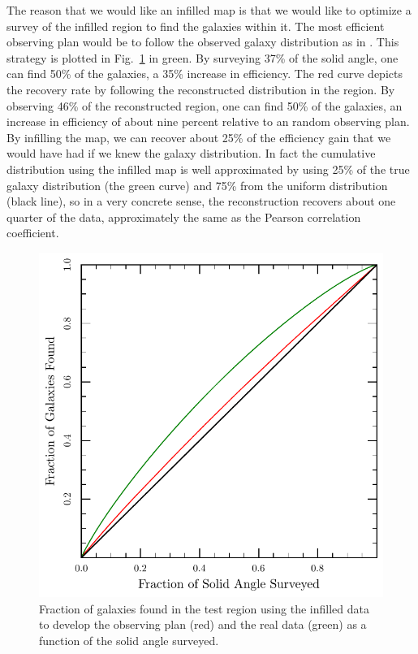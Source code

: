 \documentclass[useAMS,usenatbib]{mn2e}
\begin{document}
The reason that we would like an infilled map is that we would like to
optimize a survey of the infilled region to find the galaxies within
it.  The most efficient observing plan would be to follow the observed
galaxy distribution as in \citet{2016MNRAS.462.1085A}.  This strategy
is plotted in Fig.~\ref{fig:test_dist} in green.  By surveying 37\% of
the solid angle, one can find 50\% of the galaxies, a 35\% increase in
efficiency.  The red curve depicts the recovery rate by following the
reconstructed distribution in the region.  By observing 46\% of the
reconstructed region, one can find 50\% of the galaxies, an increase
in efficiency of about nine percent relative to an random observing
plan.  By infilling the map, we can recover about 25\% of the
efficiency gain that we would have had if we knew the galaxy
distribution. In fact the cumulative distribution using the infilled
map is well approximated by using 25\% of the true galaxy distribution
(the green curve) and 75\% from the uniform distribution (black line),
so in a very concrete sense, the reconstruction recovers about one
quarter of the data, approximately the same as the Pearson correlation
coefficient.
\begin{figure}
  \includegraphics[width=\columnwidth]{test_dist}
  \caption{Fraction of galaxies found in the test region using the infilled data to develop the observing plan (red) and the real data (green)
 as a function of the solid angle surveyed. }
  \label{fig:test_dist}
\end{figure}
\end{document}
